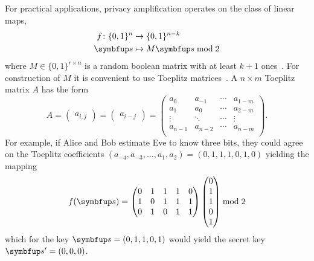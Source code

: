 For practical applications, privacy amplification operates on the class of linear maps,
\begin{equation}
	\begin{split}
		f\colon\{0,1\}^n&\to \{0,1\}^{n-k}\\
		\vb{s}&\mapsto M\vb{s}\bmod{2}
	\end{split}
\end{equation}
where $M\in\{0,1\}^{r\times n}$ is a random boolean matrix with at least $k+1$ ones~\cite{Bennett1985}.
For construction of $M$ it is convenient to use Toeplitz matrices~\cite[p.~11]{Fung2010}.
A $n\times m$ Toeplitz matrix $A$ has the form
\begin{equation}
	A
	=
	\begin{pmatrix}
		a_{i,j}
	\end{pmatrix}
	=
	\begin{pmatrix}
		a_{i-j}
	\end{pmatrix}
	=
	\begin{pmatrix}
		a_0 & a_{-1} & \cdots & a_{1-m} \\
		a_1 & a_0 & \cdots & a_{2-m} \\
		\vdots & \ddots & \cdots & \vdots \\
		a_{n-1} & a_{n-2} & \cdots & a_{n-m} \\
	\end{pmatrix}
	.
\end{equation}
For example, if Alice and Bob estimate Eve to know three bits, they could agree on the Toeplitz coefficients $(a_{-4},a_{-3},\dots,a_1,a_2)=(0,1,1,1,0,1,0)$ yielding the mapping
\begin{equation}
	f(\vb{s})
	=
	\begin{pmatrix}
		0 & 1 & 1 & 1 & 0 \\
		1 & 0 & 1 & 1 & 1 \\
		0 & 1 & 0 & 1 & 1 \\
	\end{pmatrix}
	\begin{pmatrix}
		0 \\
		1 \\
		1 \\
		0 \\
		1 \\
	\end{pmatrix}
	\bmod{2}
\end{equation}
which for the key $\vb{s}=(0,1,1,0,1)$ would yield the secret key $\vb{s}^\prime=(0,0,0)$.
